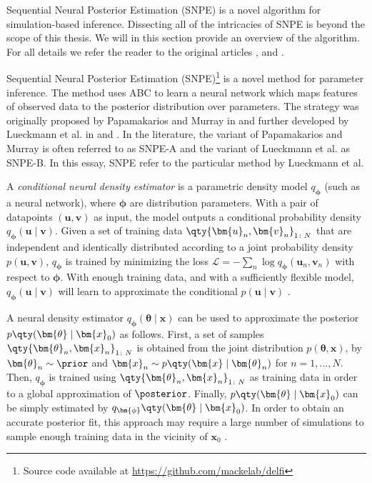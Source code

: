 Sequential Neural Posterior Estimation (SNPE) is a novel algorithm for simulation-based inference. Dissecting all of the intricacies of SNPE is beyond the scope of this thesis. We will in this section provide an overview of the algorithm. For all details we refer the reader to the original articles \cite{SNL_first}, \cite{SNPE_first} and \cite{SNPE_apt}.

Sequential Neural Posterior Estimation (SNPE)\footnote{Source code available at \url{https://github.com/mackelab/delfi}} is a novel method for parameter inference. The method uses ABC to learn a neural network which maps features of observed data to the posterior distribution over parameters. The strategy was originally proposed by Papamakarios and Murray in \cite{papamakarios2016fast} and further developed by Lueckmann et al. in \cite{SNPE17} and \cite{SNPE19}. In the literature, the variant of Papamakarios and Murray is often referred to as SNPE-A and the variant of Lueckmann et al. as SNPE-B. In this essay, SNPE refer to the particular method by Lueckmann et al.

A \textit{conditional neural density estimator} is a parametric density model $q_{\bm{\phi}}$ (such as a neural network), where $\bm{\phi}$ are distribution parameters. With a pair of datapoints $(\bm{u}, \bm{v})$ as input, the model outputs a conditional probability density $q_{\bm{\phi}}(\bm{u}\mid \bm{v})$. Given a set of training data $\qty{\bm{u}_n, \bm{v}_n}_{1\colon N}$ that are independent and identically distributed according to a joint probability density $p(\bm{u}, \bm{v})$, $q_{\bm{\phi}}$ is trained by minimizing the loss $\mathcal{L} = - \sum_n \log q_{\bm{\phi}}(\bm{u}_n, \bm{v}_n)$ with respect to $\bm{\phi}$. With enough training data, and with a sufficiently flexible model, $q_{\bm{\phi}}(\bm{u}\mid \bm{v})$ will learn to approximate the conditional $p(\bm{u}\mid \bm{v})$ \cite{SNL18}. 

A neural density estimator $q_{\bm{\phi}}(\bm{\theta} \mid \bm{x})$ can be used to approximate the posterior $p \qty(\bm{\theta}\mid \bm{x}_0)$ as follows. First, a set of samples $\qty{\bm{\theta}_n , \bm{x}_n}_{1\colon N}$ is obtained from the joint distribution $p (\bm{\theta}, \bm{x})$, by $\bm{\theta}_n \sim \prior$ and $\bm{x}_n \sim p \qty(\bm{x} \mid \bm{\theta}_n)$ for $n=1, ..., N$. Then, $q_{\bm{\phi}}$ is trained using $\qty{\bm{\theta}_n , \bm{x}_n}_{1\colon N}$ as training data in order to a global approximation of $\posterior$. Finally, $p \qty(\bm{\theta} \mid \bm{x}_0)$ can be simply estimated by $q_{\bm{\phi}} \qty(\bm{\theta} \mid \bm{x}_0)$. In order to obtain an accurate posterior fit, this approach may require a large number of simulations to sample enough training data in the vicinity of $\bm{x}_0$ \cite{SNL18}. 

